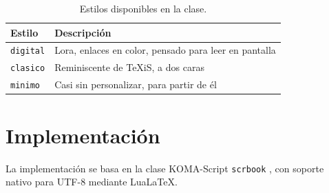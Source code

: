 \begin{table}
  \centering
  \begin{tabular}{|l|l|}
    \hline
    \textbf{Estilo} & \textbf{Descripción} \\
    \hline
    \texttt{digital} & Lora, enlaces en color, pensado para leer en pantalla \\
    \hline
    \texttt{clasico} & Reminiscente de TeXiS, a dos caras \\
    \hline
    \texttt{minimo} & Casi sin personalizar, para partir de él \\
    \hline
  \end{tabular}
  \caption{Estilos disponibles en la clase.}
  \label{tab:estilos}
\end{table}

\section{Implementación}

La implementación se basa en la clase KOMA-Script
\texttt{scrbook} \autocite{kohm2004koma}, con soporte nativo para UTF-8 mediante
LuaLaTeX.

